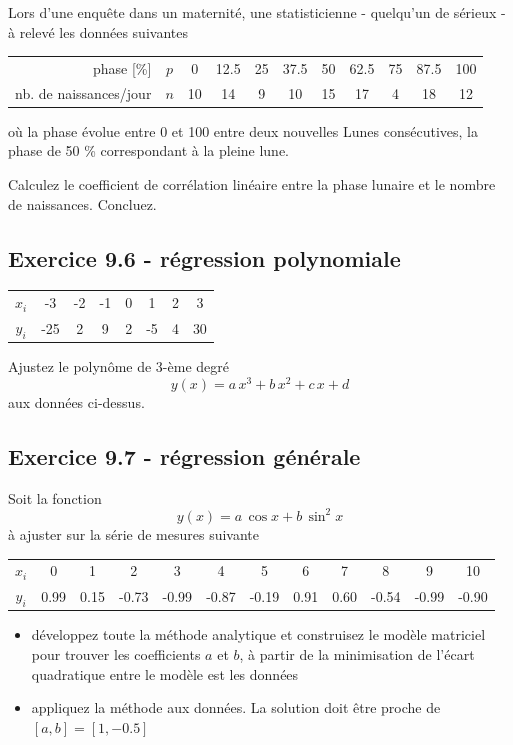 Lors d'une enquête dans un maternité, une statisticienne - quelqu'un de sérieux - à relevé les données suivantes
\begin{center}
    \begin{tabular}{r|c|ccccccccc}
        phase [\%]             & $p$ & 0  & 12.5 & 25 & 37.5 & 50 & 62.5 & 75 & 87.5 & 100 \\
        nb. de naissances/jour & $n$ & 10 & 14   & 9  & 10   & 15 & 17   & 4  & 18   & 12
    \end{tabular}
\end{center}
où la phase évolue entre 0 et 100 entre deux nouvelles Lunes consécutives, la phase de 50 \% correspondant à la pleine lune.

Calculez le coefficient de corrélation linéaire entre la phase lunaire et le nombre de naissances. Concluez.

\subsection*{Exercice 9.6 - régression polynomiale}

\begin{center}
    \begin{tabular}{c|ccccccc}
        $x_i$ & -3  & -2 & -1 & 0 & 1  & 2 & 3  \\
        $y_i$ & -25 & 2  & 9  & 2 & -5 & 4 & 30
    \end{tabular}
\end{center}
Ajustez le polynôme de 3-ème degré $$y(x)=a\,x^3+b\,x^2+c\,x+d$$ aux données ci-dessus.

\subsection*{Exercice 9.7 - régression générale}

Soit la fonction
$$
    y(x)=a\,\cos{x}+b\,\sin^{2}{x}
$$
à ajuster sur la série de mesures suivante
\begin{center}
    \begin{tabular}{c|ccccccccccc}
        $x_i$ & 0    & 1    & 2     & 3     & 4     & 5     & 6    & 7    & 8     & 9     & 10    \\
        $y_i$ & 0.99 & 0.15 & -0.73 & -0.99 & -0.87 & -0.19 & 0.91 & 0.60 & -0.54 & -0.99 & -0.90
    \end{tabular}
\end{center}
\begin{itemize}
    \item développez toute la méthode analytique et construisez le modèle matriciel pour trouver les coefficients $a$ et $b$, à partir de la minimisation de l'écart quadratique entre le modèle est les données
    \item appliquez la méthode aux données. La solution doit être proche de $[a,b]=[1,-0.5]$
\end{itemize}

